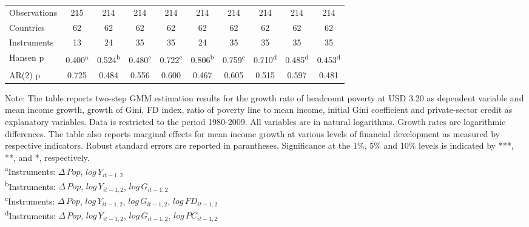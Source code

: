 \documentclass[12pt, a4paper]{article}
\begin{document}
\begin{table}
\begin{threeparttable}
{\begin{tabular}{l*{9}{c}}
				\hline
				Observations        &         215         &         214         &         214         &         214         &         214         &         214         &         214         &         214         &         214         \\
				Countries           &          62         &          62         &          62         &          62         &          62         &          62         &          62         &          62         &          62         \\
				Instruments         &          13         &          24         &          35         &          35         &          24         &          35         &          35         &          35         &          35         \\
				Hansen p         &       0.400\textsuperscript{a}         &       0.524\textsuperscript{b}         &       0.480\textsuperscript{c}         &       0.722\textsuperscript{c}         &       0.806\textsuperscript{b}         &       0.759\textsuperscript{c}         &       0.710\textsuperscript{d}         &       0.485\textsuperscript{d}         &       0.453\textsuperscript{d}         \\
				AR(2) p              &       0.725         &       0.484         &       0.556         &       0.600         &       0.467         &       0.605         &       0.515         &       0.597         &       0.481         \\
				\hline\hline
			\end{tabular}
		}
		\begin{tablenotes}
			\item \scriptsize{Note: The table reports two-step GMM estimation results for the growth rate of headcount poverty at USD 3.20 as dependent variable and mean income growth, growth of Gini, FD index, ratio of poverty line to mean income, initial Gini coefficient and private-sector credit as explanatory variables. Data is restricted to the period 1980-2009. All variables are in natural logarithms. Growth rates are logarithmic differences. The table also reports marginal effects for mean income growth at various levels of financial development as measured by respective indicators. Robust standard errors are reported in parantheses. Significance at the 1\%, 5\% and 10\% levels is indicated by ***, **, and *, respectively.\\
				\textsuperscript{a}Instruments: $\Delta \, Pop$, $log \, Y_{it-1,2}$}\\
			\textsuperscript{b}Instruments: $\Delta \, Pop$, $log \, Y_{it-1,2}$, $log \, G_{it-1,2}$\\
			\textsuperscript{c}Instruments: $\Delta \, Pop$, $log \, Y_{it-1,2}$, $log \, G_{it-1,2}$, $log \, FD_{it-1,2}$\\
			\textsuperscript{d}Instruments: $\Delta \, Pop$, $log \, Y_{it-1,2}$, $log \, G_{it-1,2}$, $log \, PC_{it-1,2}$\\
			

\end{tablenotes}
\end{threeparttable}
\end{table}
\end{document}
